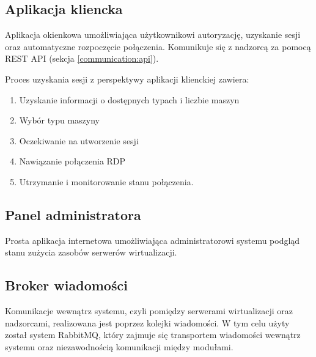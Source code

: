 \documentclass[../opis-rozwiazania.tex]{subfiles}
\begin{document}
\subsection{Aplikacja kliencka}
\label{modules:client}

Aplikacja okienkowa umożliwiająca użytkownikowi autoryzację, uzyskanie sesji oraz automatyczne rozpoczęcie połączenia. Komunikuje się z nadzorcą za pomocą REST API (sekcja \ref{communication:api}).

Proces uzyskania sesji z perspektywy aplikacji klienckiej zawiera:
\begin{enumerate}
  \item Uzyskanie informacji o dostępnych typach i liczbie maszyn
  \item Wybór typu maszyny
  \item Oczekiwanie na utworzenie sesji
  \item Nawiązanie połączenia RDP
  \item Utrzymanie i monitorowanie stanu połączenia.
\end{enumerate}

\subsection{Panel administratora}

Prosta aplikacja internetowa umożliwiająca administratorowi systemu podgląd stanu zużycia zasobów serwerów wirtualizacji.

\subsection{Broker wiadomości}
\label{modules:broker}

Komunikacje wewnątrz systemu, czyli pomiędzy serwerami wirtualizacji oraz nadzorcami, realizowana jest  poprzez kolejki wiadomości. W tym celu użyty został system RabbitMQ, który zajmuje się transportem wiadomości wewnątrz systemu oraz niezawodnością komunikacji między modułami.
\end{document}
